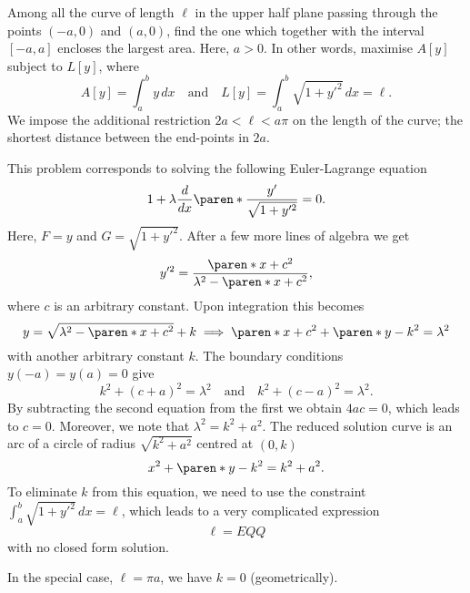 \documentclass[11pt]{penrose}
\begin{document}
\begin{negg}
    Among all the curve of length $\ell$ in the upper half plane passing through the points $(-a, 0)$ and $(a, 0)$, find the one which together with the interval $[-a, a]$ encloses the largest area. Here, $a > 0$. In other words, maximise $A[y]$ subject to $L[y]$, where
    \begin{equation}
        A[y] = \int_a^b y \,dx
        \quad\text{and}\quad
        L[y] = \int_a^b \sqrt{1 + y'^2} \,dx = \ell.
    \end{equation}
    We impose the additional restriction $2a < \ell < a\pi$ on the length of the curve; the shortest distance between the end-points in $2a$.

    This problem corresponds to solving the following Euler-Lagrange equation
    \begin{equation}
        1 + \lambda \frac{d}{dx} \paren*{ \frac{y'}{\sqrt{1+y'^2}} } = 0.
    \end{equation}
    Here, $F = y$ and $G = \sqrt{1 + y'^2}$. After a few more lines of algebra we get
    \begin{equation}
        y'^2 = \frac{\paren*{x+c}^2}{\lambda^2 - \paren*{x+c}^2},
    \end{equation}
    where $c$ is an arbitrary constant. Upon integration this becomes
    \begin{equation}
        y = \sqrt{\lambda^2 - \paren*{x+c}^2} + k
        \implies
        \paren*{x+c}^2 + \paren*{y-k}^2 = \lambda^2
    \end{equation}
    with another arbitrary constant $k$. The boundary conditions $y(-a) = y(a) = 0$ give
    \begin{equation}
        k^2 + (c+a)^2 = \lambda^2
        \quad\text{and}\quad
        k^2 + (c-a)^2 = \lambda^2.
    \end{equation}
    By subtracting the second equation from the first we obtain $4ac = 0$, which leads to $c = 0$. Moreover, we note that $\lambda^2 = k^2 + a^2$. The reduced solution curve is an arc of a circle of radius $\sqrt{k^2 + a^2}$ centred at $(0, k)$
    \begin{equation}
        x^2 + \paren*{y-k}^2 = k^2 + a^2.
    \end{equation}
    To eliminate $k$ from this equation, we need to use the constraint $\int_a^b \sqrt{1 + y'^2} \,dx = \ell$, which leads to a very complicated expression
    \begin{equation}
        \ell = EQQ
    \end{equation}
    with no closed form solution.

    In the special case, $\ell = \pi a$, we have $k = 0$ (geometrically).
\end{negg}
\end{document}
